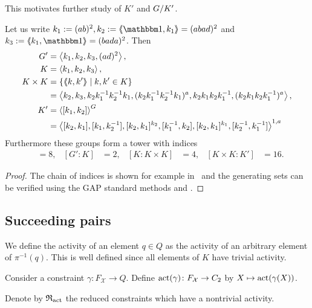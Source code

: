 \documentclass[a4paper,11pt]{amsart}
\begin{document}
This motivates further study of $K'$ and ${G/K'}$.
\begin{lem} \label{lem:subgroupsOfG}
Let us write $k_1 := (ab)^2, k_2:=\pair{\id,k_1} = (abad)^2$ and $k_3:=\pair{k_1,\id} = (bada)^2$. Then 
 \begin{align*}
  G' &= \left< k_1,k_2,k_3,(ad)^2\right>, \\
  K &= \left< k_1,k_2,k_3\right>, \\
  K\times K &= \{\langle\negthickspace\langle k,k'\rangle\negthickspace\rangle \mid k,k'\in K\} \\&= \left< k_2,k_3,k_2k_1^{-1}k_2^{-1}k_1,(k_2k_1^{-1}k_2^{-1}k_1)^a,k_2k_1k_2k_1^{-1},(k_2k_1k_2k_1^{-1})^a  \right>,\\
  K' &= \left< [k_1,k_2] \right>^G \\ 
  &= \left<[k_2,k_1],[k_1,k_2^{-1}],[k_2,k_1]^{k_2},[k_1^{-1},k_2], [k_2,k_1]^{k_1},[k_2^{-1},k_1^{-1}]\right>^{1,a} 
 \end{align*}
Furthermore these groups form a tower with indices
\begin{align*}
  [G:G']&=8, & [G':K]&=2, &[K:K\times K]&= 4, &[K\times K:K']&=16. 
\end{align*}
\end{lem}
\begin{proof}
 The chain of indices is shown for example in~\cite{Bartholdi-Grigorchuk-Sunik:BranchGroups} 
 and the generating sets can be verified using the GAP standard methods
  and . 
\end{proof}

\subsection{Succeeding pairs}
\begin{defi}
  We define the activity of an element $q\in Q$ as the activity of an
  arbitrary element of $\pi^{-1}(q)$.  This is well defined since
  all elements of $K$ have trivial activity.
 
  Consider a constraint $\gamma\colon F_{\mathcal{X}} \to Q$.  Define
  $\operatorname{act}(\gamma)\colon F_{\mathcal{X}}\to C_2$ by
  $X \mapsto \operatorname{act}(\gamma(X))$.
 
  Denote by $\mathfrak{R}_{\operatorname{act}}$ the reduced constraints which have a
  nontrivial activity.
\end{defi}
\end{document}
